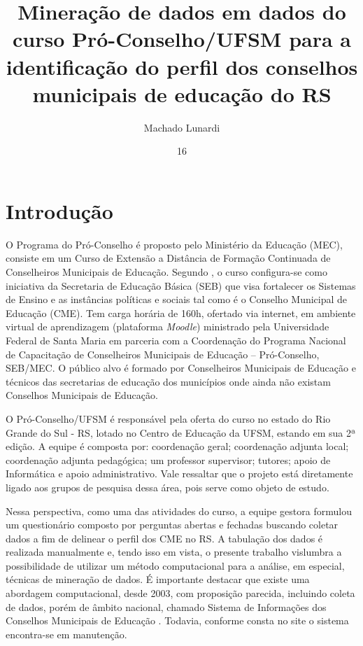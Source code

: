 \documentclass[tg]{mdtufsm}
\title{Mineração de dados em dados do curso Pró-Conselho/UFSM para a identificação do perfil dos conselhos municipais de educação do RS}
\author{Machado Lunardi}{Gabriel}
\institute{Centro de Tecnologia}
\date{16}{Outubro}{2014}
\begin{document}
\maketitle
\setlength{\baselineskip}{1.5\baselineskip}

\tableofcontents
\newpage

\chapter{Introdução}

O Programa do Pró-Conselho é proposto pelo Ministério da Educação (MEC), consiste em um Curso de Extensão a Distância de Formação Continuada de Conselheiros Municipais de Educação. Segundo \cite{Lunardi-2014}, o curso configura-se como iniciativa da Secretaria de Educação Básica (SEB) que visa fortalecer os Sistemas de Ensino e as instâncias políticas e sociais tal como é o Conselho Municipal de Educação (CME). Tem carga horária de 160h, ofertado via internet, em ambiente virtual de aprendizagem (plataforma \textit{Moodle}) ministrado pela Universidade Federal de Santa Maria em parceria com a Coordenação do Programa Nacional de Capacitação de Conselheiros Municipais de Educação – Pró-Conselho, SEB/MEC. O público alvo é formado por Conselheiros Municipais de Educação e técnicos das secretarias de educação dos municípios onde ainda não existam Conselhos Municipais de Educação. 

O Pró-Conselho/UFSM é responsável pela oferta do curso no estado do Rio Grande do Sul - RS, lotado no Centro de Educação da UFSM, estando em sua 2ª edição. A equipe é composta por: coordenação geral; coordenação adjunta local; coordenação adjunta pedagógica; um professor supervisor; tutores; apoio de Informática e apoio administrativo. Vale ressaltar que o projeto está diretamente ligado aos grupos de pesquisa dessa área, pois serve como objeto de estudo. 

Nessa perspectiva, como uma das atividades do curso, a equipe gestora formulou um questionário composto por perguntas abertas e fechadas buscando coletar dados a fim de delinear o perfil dos CME no RS. A tabulação dos dados é realizada manualmente e, tendo isso em vista, o presente trabalho vislumbra a possibilidade de utilizar um método computacional para a análise, em especial, técnicas de mineração de dados. É importante destacar que existe uma abordagem computacional, desde 2003, com proposição parecida, incluindo coleta de dados, porém de âmbito nacional, chamado Sistema de Informações dos Conselhos Municipais de Educação \cite{sicme-site}. Todavia, conforme consta no site \cite{mec-site} o sistema encontra-se em manutenção. 
\end{document}
